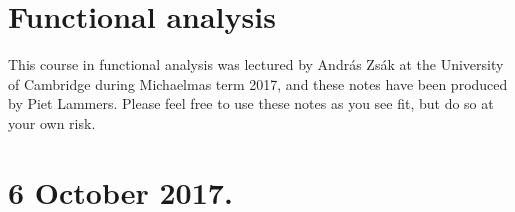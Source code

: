 \documentclass[11pt]{article}
\numberwithin{number_within_section}{section}
\theoremstyle{definition}
\begin{document}
\section*{\LARGE Functional analysis}

\leftskip=1.5cm\rightskip=1.5cm

This course in functional analysis was lectured by Andr\'as Zs\'ak at the University of Cambridge during Michaelmas term 2017,
and these notes have been produced by Piet Lammers.
Please feel free to use these notes as you see fit, but do so at your own risk.

\leftskip=0cm \rightskip=0cm


\section{6 October 2017.}

\end{document}
